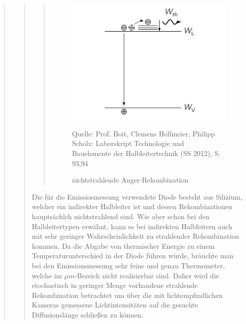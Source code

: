 \begin{quote}
\begin{quote}
\begin{quote}
            \begin{figure}[H]
                    \centering
                        \includegraphics[scale=0.78, trim = 1cm 0cm 1.5cm 0cm,
                        clip]{./Emissionsbilder/restliches/auger.png}
                        \caption{nichtstrahlende Auger-Rekombination}

                                \begin{center}
                                    \small Quelle: Prof. Boit, Clemens Helfmeier, Philipp Scholz: Laborskript Technologie und Bauelemente der Halbleitertechnik (SS 2012), S. 93,94
                                \end{center}
                            \label{fig:./Emissionsbilder/restliches/auger.png}
            \end{figure}

            \end{quote}

        Die für die Emissiosmessung verwendete Diode besteht aus Silizium,
        welcher ein indirekter Halbleiter ist und dessen Rekombinationen
        hauptsächlch nichtstrahlend sind. Wie aber schon bei den Halbleitertypen
        erwähnt, kann es bei indirekten Halbleitern auch mit sehr geringer
        Wahrscheinlichkeit zu strahlender Rekombination kommen. Da die Abgabe
        von thermischer Energie zu einem Temperaturunterschied in der Diode
        führen würde, bräuchte man bei den Emissionsmessung sehr feine und genau
        Thermometer, welche im $\mu m$-Bereich nicht realisierbar sind. Daher
        wird die stochastisch in geringer Menge vorhandene strahlende
        Rekombination betrachtet um über die mit lichtempfindlichen
        Kameras gemessene Lichtintensitäten auf die gesuchte Diffusionslänge
        schließen zu können.


\end{quote}
\end{quote}
